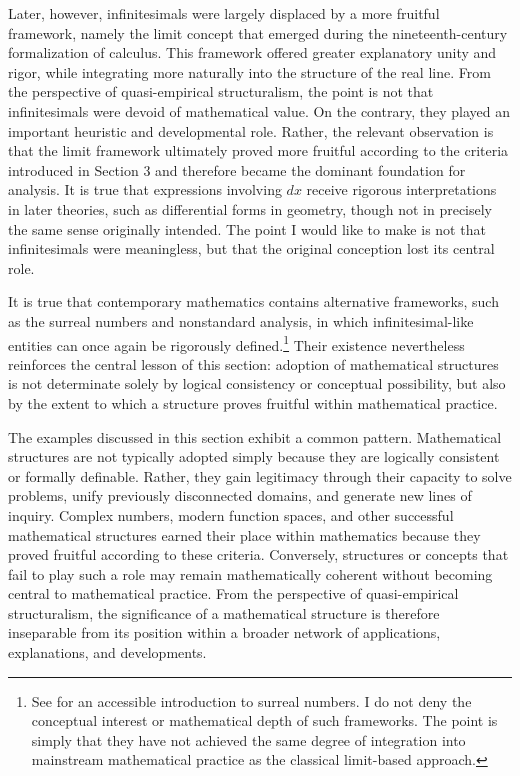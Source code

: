 \documentclass[11pt,a4paper]{article}
\begin{document}
Later, however, infinitesimals were largely displaced by a more fruitful framework, namely the limit concept that emerged during the nineteenth-century formalization of calculus. This framework offered greater explanatory unity and rigor, while integrating more naturally into the structure of the real line. From the perspective of quasi-empirical structuralism, the point is not that infinitesimals were devoid of mathematical value. On the contrary, they played an important heuristic and developmental role. Rather, the relevant observation is that the limit framework ultimately proved more fruitful according to the criteria introduced in Section 3 and therefore became the dominant foundation for analysis. It is true that expressions involving $dx$ receive rigorous interpretations in later theories, such as differential forms in geometry, though not in precisely the same sense originally intended. The point I would like to make is not that infinitesimals were meaningless, but that the original conception lost its central role.

It is true that contemporary mathematics contains alternative frameworks, such as the surreal numbers and nonstandard analysis, in which infinitesimal-like entities can once again be rigorously defined.\footnote{See \textcite{Knuth1974} for an accessible introduction to surreal numbers. I do not deny the conceptual interest or mathematical depth of such frameworks. The point is simply that they have not achieved the same degree of integration into mainstream mathematical practice as the classical limit-based approach.} Their existence nevertheless reinforces the central lesson of this section: adoption of mathematical structures is not determinate solely by logical consistency or conceptual possibility, but also by the extent to which a structure proves fruitful within mathematical practice.

The examples discussed in this section exhibit a common pattern. Mathematical structures are not typically adopted simply because they are logically consistent or formally definable. Rather, they gain legitimacy through their capacity to solve problems, unify previously disconnected domains, and generate new lines of inquiry. Complex numbers, modern function spaces, and other successful mathematical structures earned their place within mathematics because they proved fruitful according to these criteria. Conversely, structures or concepts that fail to play such a role may remain mathematically coherent without becoming central to mathematical practice. From the perspective of quasi-empirical structuralism, the significance of a mathematical structure is therefore inseparable from its position within a broader network of applications, explanations, and developments.
\end{document}

